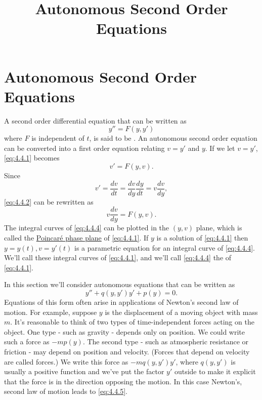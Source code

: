 \documentclass{ximera}
\title{Autonomous Second Order Equations}%
\begin{document}
\begin{abstract}

\end{abstract}

\maketitle

\section*{Autonomous Second Order Equations}

A second order differential equation that can be written as
\begin{equation} \label{eq:4.4.1}
y''=F(y,y')
\end{equation}
where $F$ is independent of $t$, is said to be .
An autonomous second order equation can be converted into a first
order equation relating $v=y'$ and $y$. If we let $v=y'$,
\eqref{eq:4.4.1} becomes
\begin{equation} \label{eq:4.4.2}
v'=F(y,v).
\end{equation}
Since
\begin{equation} \label{eq:4.4.3}
v'=\frac{dv}{dt}=\frac{dv}{dy}\frac{dy}{dt}=v\frac{dv}{dy},
\end{equation}
\eqref{eq:4.4.2} can be rewritten as
\begin{equation} \label{eq:4.4.4}
v\frac{dv}{dy}=F(y,v).
\end{equation}
The integral curves of \eqref{eq:4.4.4} can be plotted in the $(y,v)$
plane, which is called the
\href{http://www-history.mcs.st-and.ac.uk/Mathematicians/Poincare.html}{Poincar\'e phase plane} of \eqref{eq:4.4.1}. If $y$ is a solution of
\eqref{eq:4.4.1}
then $y=y(t), v=y'(t)$ is a parametric equation for an integral curve
of \eqref{eq:4.4.4}. We'll call these integral curves  of \eqref{eq:4.4.1}, and we'll call
\eqref{eq:4.4.4} the  of \eqref{eq:4.4.1}.

In this section we'll consider  autonomous equations
that can be written as
\begin{equation} \label{eq:4.4.5}
y''+q(y,y')y'+p(y)=0.
\end{equation}
Equations of this form often arise in applications of Newton's second
law of motion. For example, suppose  $y$ is the displacement of a
moving object with mass $m$. It's  reasonable to think of two
types of time-independent forces acting on the object. One type - such
as gravity - depends only on position. We could write such a force as
$-mp(y)$. The second type - such as atmospheric resistance or friction
- may depend on position and velocity. (Forces that depend on velocity
are called  forces.) We  write this force as
$-mq(y,y')y'$, where $q(y,y')$ is usually a positive function and
we've put the factor $y'$ outside  to make it
explicit that the force
is in the direction opposing the motion. In this case Newton's, second
law of motion leads to \eqref{eq:4.4.5}.
\end{document}
